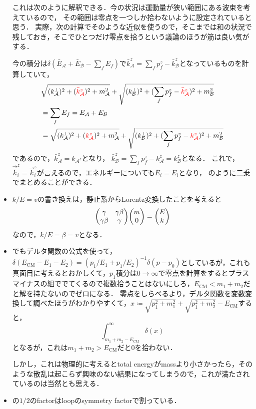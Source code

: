 \begin{itemize}
		これは次のように解釈できる．今の状況は運動量が狭い範囲にある波束を考えているので，
		その範囲は零点を一つしか拾わないように設定されていると思う．
		実際，次の計算でそのような近似を使うので，そこまでは和の状況で残しておき，そこでひとつだけ零点を拾うという議論のほうが筋は良い気がする．

		今の積分は$\delta(\bar{E}_{\mathcal{A}} + \bar{E}_{\mathcal{B}}-\sum_fE_f)$で$\bar{k}_{\mathcal{A}}^z = \sum_fp_f^z - \bar{k}_{\mathcal{B}}^z$となっているものを計算していて，
		\begin{align}
			&\sqrt{(k_{\mathcal{A}}^{\perp})^2+(\textcolor{red}{\bar{k}_{\mathcal{A}}^z})^2+m_{\mathcal{A}}^2} + \sqrt{(k_{\mathcal{B}}^{\perp})^2 + (\sum_fp_f^z-\textcolor{red}{\bar{k}_{\mathcal{A}}^z})^2+m_{\mathcal{B}}^2}\\
			& = \sum_fE_f = E_{\mathcal{A}} + E_{\mathcal{B}}\\
			& = \sqrt{(k_{\mathcal{A}}^{\perp})^2+(\textcolor{red}{k_{\mathcal{A}}^z})^2+m_{\mathcal{A}}^2} + \sqrt{(k_{\mathcal{B}}^{\perp})^2 + (\sum_fp_f^z-\textcolor{red}{k_{\mathcal{A}}^z})^2+m_{\mathcal{B}}^2}
		\end{align}
		であるので，$\bar{k}_{\mathcal{A}}^z = k_{\mathcal{A}^z}$となり，
		$\bar{k}_{\mathcal{B}}^z = \sum_fp_f^z-k_{\mathcal{A}}^z = k_{\mathcal{B}}^z$となる．
		これで，$\vec{\bar{k}}_{i}^z = \vec{k}_i^z$が言えるので，エネルギーについても$\bar{E}_i=E_i$となり，
		のように二乗でまとめることができる．
	\item $k/E = v$の書き換えは，静止系からLorentz変換したことを考えると
		\begin{equation}
			\mqty(\gamma & \gamma\beta\\ \gamma\beta & \gamma)\mqty(m\\0) = \mqty(E\\k)
		\end{equation}
		なので，$k/E = \beta = v$となる．

	\item {}でもデルタ関数の公式を使って，$\delta(E_{\text{CM}}-E_1-E_2)=(p_1/E_1 + p_1/E_2)^{-1}\delta(p-p_0)$としているが，これも真面目に考えるとおかしくて，$p_1$積分は$0\to \infty$で零点を計算をするとプラスマイナスの組ででてくるので複数拾うことはないにしろ，$E_{\text{CM}} < m_1+m_2$だと解を持たないのでゼロになる．
		零点をしらべるより，デルタ関数を変数変換して調べたほうがわかりやすくて\cite{Schwartz:2014sze}，$x\coloneqq \sqrt{p_1^2+m_1^2} + \sqrt{p_1^2 + m_2^2} - E_{\text{CM}}$すると，
		\begin{equation}
		\int_{m_1+m_2-E_{\text{CM}}}^{\infty}\delta(x)
		\end{equation}
		となるが，これは$m_1+m_2 > E_{\text{CM}}$だと$0$を拾わない．
		
		しかし，これは物理的に考えるとtotal energyがmassより小さかったら，そのような散乱は起こらず興味のない結果になってしまうので，これが満たされているのは当然とも思える．
	\item {}の$1/2$のfactorはloopのsymmetry factorで割っている．
\end{itemize}
